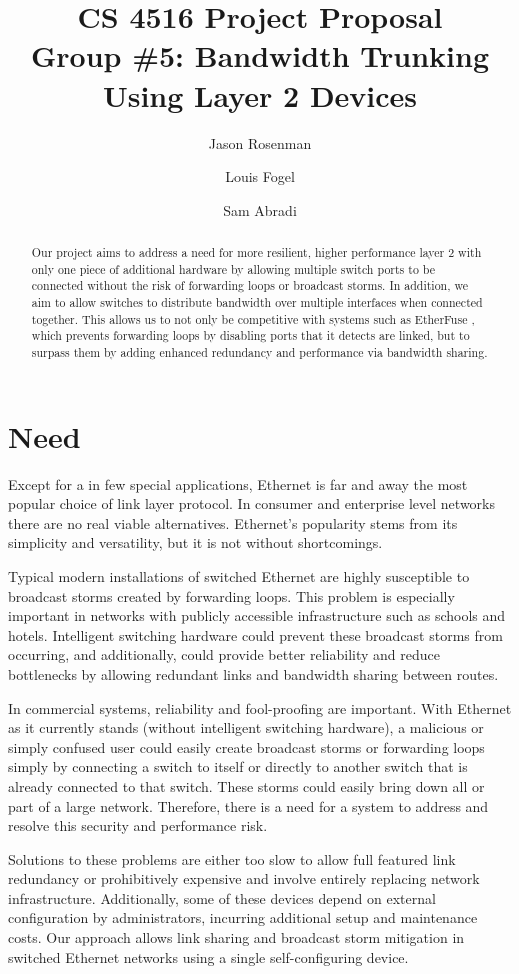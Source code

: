 \documentclass{article}
\title{CS 4516 Project Proposal\\Group \#5: Bandwidth Trunking Using Layer 2 Devices}
\author{Jason Rosenman \and Louis Fogel \and Sam Abradi}
\date{}
\begin{document}
\maketitle
\begin{abstract}
	Our project aims to address a need for more resilient, higher performance layer 2 with only one piece of additional hardware by allowing multiple switch ports to be connected without the risk of forwarding loops or broadcast storms.
	In addition, we aim to allow switches to distribute bandwidth over multiple interfaces when connected together.
	This allows us to not only be competitive with systems such as EtherFuse \cite{etherfuse}, which prevents forwarding loops by disabling ports that it detects are linked, but to surpass them by adding enhanced redundancy and performance via bandwidth sharing.
\end{abstract}
\section{Need}
	Except for a in few special applications, Ethernet is far and away the most popular choice of link layer protocol.
	In consumer and enterprise level networks there are no real viable alternatives.
	Ethernet's popularity stems from its simplicity and versatility, but it is not without shortcomings.

	Typical modern installations of switched Ethernet are highly susceptible to broadcast storms created by forwarding loops.
	This problem is especially important in networks with publicly accessible infrastructure such as schools and hotels.
	Intelligent switching hardware could prevent these broadcast storms from occurring, and additionally, could provide better reliability and reduce bottlenecks by allowing redundant links and bandwidth sharing between routes.
	
	In commercial systems, reliability and fool-proofing are important.
	With Ethernet as it currently stands (without intelligent switching hardware), a malicious or simply confused user could easily create broadcast storms or forwarding loops simply by connecting a switch to itself or directly to another switch that is already connected to that switch.
	These storms could easily bring down all or part of a large network.
	Therefore, there is a need for a system to address and resolve this security and performance risk.
	
	Solutions to these problems are either too slow to allow full featured link redundancy or prohibitively expensive and involve entirely replacing network infrastructure.
	Additionally, some of these devices depend on external configuration by administrators, incurring additional setup  and maintenance costs.
	Our approach allows link sharing and broadcast storm mitigation in switched Ethernet networks using a single self-configuring device.
\end{document}
